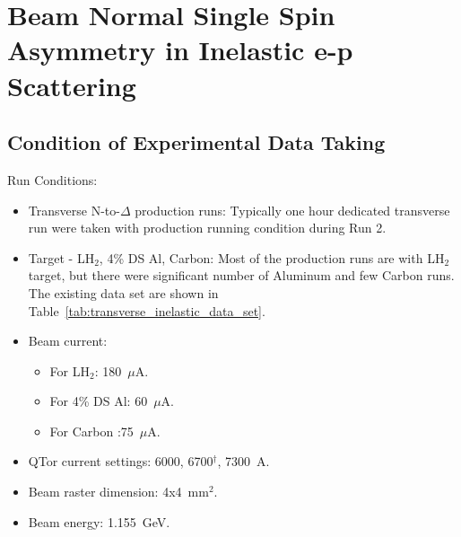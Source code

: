 \chapter{Beam Normal Single Spin Asymmetry in Inelastic e-p Scattering}
\label{Beam Normal Single Spin Asymmetry in Inelastic e-p Scattering}


\section{Condition of Experimental Data Taking}
\label{Condition of Experimental Data Taking}



Run Conditions:
\begin{itemize}
\doublespacing
\item Transverse N-to-$\Delta$ production runs: Typically one hour dedicated transverse run were taken with production running condition during Run 2.
\item Target - LH$_{2}$, 4\% DS Al, Carbon: Most of the production runs are with LH$_{2}$ target, but there were significant number of Aluminum and few Carbon runs. The existing data set are shown in Table~\ref{tab:transverse_inelastic_data_set}.
\item Beam current:
\begin{itemize}
	\item For LH$_{2}$: 180~$\mu$A.
	\item For 4\% DS Al: 60~$\mu$A.
	\item For Carbon :75~$\mu$A.
\end{itemize}

\item QTor current settings:  6000, 6700$^{\dagger}$, 7300~A.
\item Beam raster dimension: 4x4~mm$^{2}$.
\item Beam energy: 1.155~GeV.
\end{itemize}

